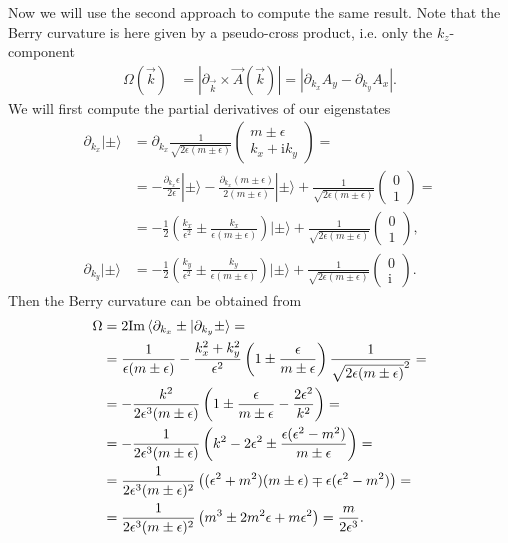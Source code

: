 \documentclass[english, parskip=full]{scrartcl}
\newcommand{\brak}{}
\newcommand{\kla}{}
\newcommand{\tecxt}{}
\newcommand{\Ket}{}
\renewcommand{\i}{\text{i}}
\begin{document}
Now we will use the second approach to compute the same result.
Note that the Berry curvature is here given by a pseudo-cross product, i.e. only the $k_z$-component 
\begin{align}
\Omega(\vec{k}) &= |\partial_{\vec{k}}\times \vec{A}(\vec{k})| = |\partial_{k_x} A_y - \partial_{k_y} A_x |.
\end{align}
We will first compute the partial derivatives of our eigenstates
\begin{align}
\partial_{k_x}\Ket | \pm \rangle &= \partial_{k_x}\frac{1}{\sqrt{2\epsilon(m\pm\epsilon)}} \begin{pmatrix}
m\pm \epsilon \\ k_x + \i k_y 
\end{pmatrix} = \\
&= -\frac{\partial_{k_x}\epsilon}{2\epsilon}\Ket | \pm \rangle - \frac{\partial_{k_x}(m\pm \epsilon)}{2(m\pm \epsilon)}\Ket | \pm \rangle + \frac{1}{\sqrt{2\epsilon(m\pm\epsilon)}} \begin{pmatrix}
0 \\ 1
\end{pmatrix} = \\
&= -\frac{1}{2}\kla\left( \frac{k_x}{\epsilon^2} \pm \frac{k_x}{\epsilon(m\pm \epsilon)} \right)\Ket | \pm \rangle + \frac{1}{\sqrt{2\epsilon(m\pm\epsilon)}} \begin{pmatrix}
0 \\ 1
\end{pmatrix},\\
\partial_{k_y}\Ket | \pm \rangle &= -\frac{1}{2}\kla\left( \frac{k_y}{\epsilon^2} \pm \frac{k_y}{\epsilon(m\pm \epsilon)} \right)\Ket | \pm \rangle + \frac{1}{\sqrt{2\epsilon(m\pm\epsilon)}} \begin{pmatrix}
0 \\ \i
\end{pmatrix}.
\end{align}
Then the Berry curvature can be obtained from
\begin{align}
\Omega &= 2\tecxt\text{Im\,}\brak\langle \partial_{k_x}\pm | \partial_{k_y}\pm \rangle = \\
&= \frac{1}{\epsilon (m\pm\epsilon)} - \frac{k_x^2+k_y^2}{\epsilon^2}\kla\left( 1\pm \frac{\epsilon}{m\pm\epsilon} \right)\frac{1}{\sqrt{2\epsilon(m\pm\epsilon)}^2} = \\
&= -\frac{k^2}{2\epsilon^3(m\pm\epsilon)}\kla\left( 1 \pm \frac{\epsilon}{m\pm\epsilon} - \frac{2\epsilon^2}{k^2} \right) = \\
&= -\frac{1}{2\epsilon^3(m\pm \epsilon)}\kla\left( k^2 - 2\epsilon^2 \pm \frac{\epsilon (\epsilon^2 - m^2)}{m\pm\epsilon} \right) = \\
&= \frac{1}{2\epsilon^3(m\pm \epsilon)^2} \kla\left( (\epsilon^2 + m^2)(m\pm\epsilon) \mp\epsilon(\epsilon^2-m^2) \right) = \\
&= \frac{1}{2\epsilon^3(m\pm \epsilon)^2} \kla\left( m^3\pm 2m^2\epsilon + m\epsilon^2 \right) = \frac{m}{2\epsilon^3} .
\end{align}
\end{document}
